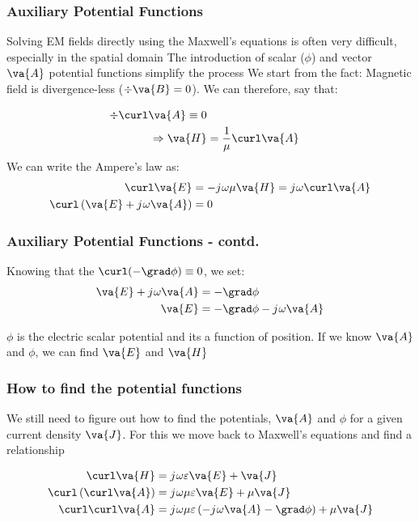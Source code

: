 \documentclass[10pt, compress]{beamer}
\renewcommand{\O}{\omega}  %
\newcommand{\E}{\varepsilon}  %
\renewcommand{\u}{\mu}  %
\renewcommand{\j}{{j}\mkern1mu} %
\begin{document}
\begin{frame}
  \frametitle{Auxiliary Potential Functions}
  \begin{outline}
    \1 Solving EM fields directly using the Maxwell's equations is often very difficult, especially in the spatial domain
    \1 The introduction of scalar (${\phi}$) and vector $\va{A}$ potential functions simplify the process
    \1 We start from the fact:
    \2 Magnetic field is divergence-less ($\div \va{B} = 0$). We can therefore, say that:
  \end{outline}
  \begin{align*}
    \div \curl \va{A} \equiv 0 \\
    \Rightarrow \va{H} &= \frac{1}{\u} \curl \va{A}
  \end{align*}
  We can write the Ampere's law as:
  \begin{align*}
    \curl \va{E} &= - \j \O \u \va{H} = \j \O \curl \va{A} \\
    \curl \left (\va{E} + \j \O \va{A} \right) &= 0
  \end{align*}
\end{frame}

\begin{frame}
  \frametitle{Auxiliary Potential Functions - contd.}
  Knowing that the $\curl (-\grad \phi) \equiv 0 $, we set:
  \begin{align*}
    \va{E} + \j \O \va{A} &= -\grad \phi \\
    \va{E} &= -\grad \phi - \j \O \va{A}
  \end{align*}
\begin{outline}
  \1 $\phi$ is the electric scalar potential and its a function of position.
  \1 If we know $\va{A}$ and $\phi$, we can find $\va{E}$ and $\va{H}$
\end{outline}
\end{frame}



\begin{frame}
  \frametitle{How to find the potential functions}

  \begin{outline}
    \1 We still need to figure out how to find the potentials,   $\va{A}$ and $\phi$ for a given current density $\va{J}$.
    \1 For this we move back to Maxwell's equations and find a relationship
  \end{outline}

  \begin{align*}
     \curl \va{H} &= \j \O \E \va{E} + \va{J} \\
     \curl \left( \curl \va{A} \right) &= \j \O \u \E \va{E} + \u \va{J} \\
     \curl \curl \va{A} &= \j \O \u \E \left(-\j \O \va{A} - \grad \phi \right) + \u \va{J}
  \end{align*}
\end{frame}
\end{document}
